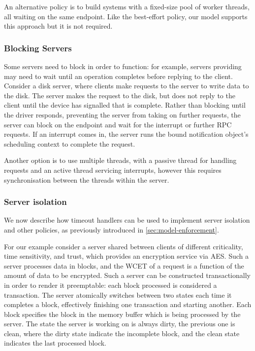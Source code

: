 An alternative policy is to build systems with a fixed-size pool of worker threads, all waiting on the
same endpoint. 
Like the best-effort policy, our model supports this approach but it is not required.

\subsubsection{Blocking Servers}

Some servers need to block in order to function: for example, servers providing \IO may need to wait
until an operation completes before replying to the client. Consider a disk server, where
clients make requests to the server to write data to the disk. The server makes the request to the
disk, but does not reply to the client until the device has signalled that \IO is complete. Rather
than blocking until the driver responds, preventing the server from taking on further requests, the
server can block on the endpoint and wait for the interrupt or further \gls{RPC} requests. If an interrupt
comes in, the server runs the bound notification object's scheduling context to complete the
request.

Another option is to use multiple threads, with a passive thread for handling requests and an active
thread servicing interrupts, however this requires synchronisation between the threads within the
server.

\subsubsection{Server isolation}

We now describe how timeout handlers can be used to implement server isolation and other policies,
as previously introduced in \cref{sec:model-enforcement}. 

For our example consider a server shared between clients of different criticality, time sensitivity,
and trust, which provides an encryption service via AES. 
Such a server processes data in blocks, and the \gls{WCET} of a request is a function of the 
amount of data to be encrypted. Such a server can be constructed transactionally in order
to render it preemptable: each block processed is considered a transaction. The server atomically
switches between two states each time it completes a block, effectively finishing one transaction
and starting another. Each block specifies the block in the memory buffer which is being processed by the
server. The state the server is working on is always dirty, the previous one is clean, where the dirty
state indicate the incomplete block, and the clean state indicates the last processed block.


